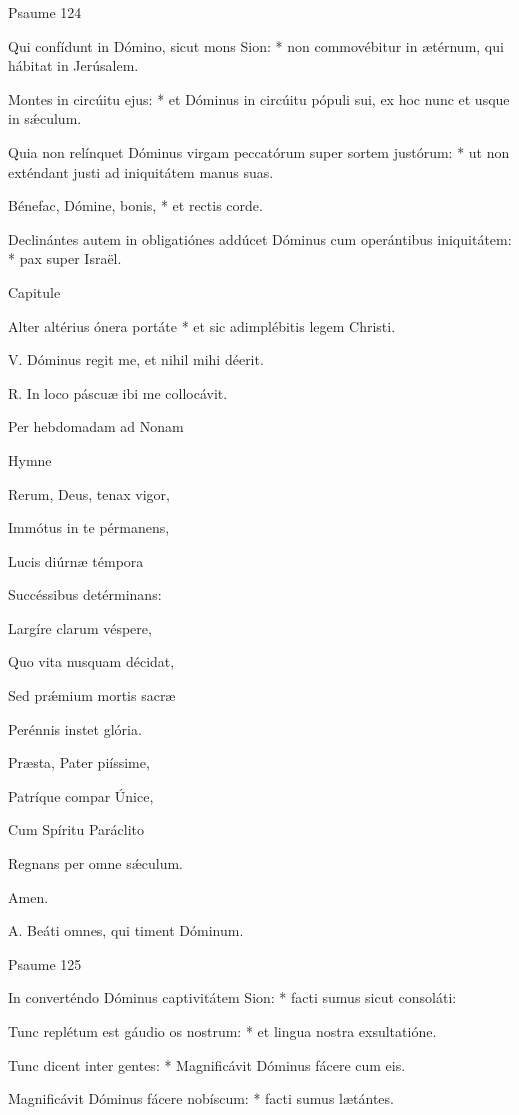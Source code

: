Psaume 124

Qui confídunt in Dómino, sicut mons Sion: * non commovébitur in ætérnum, qui hábitat in Jerúsalem.

Montes in circúitu ejus: * et Dóminus in circúitu pópuli sui, ex hoc nunc et usque in sǽculum.

Quia non relínquet Dóminus virgam peccatórum super sortem justórum: * ut non exténdant justi ad iniquitátem manus suas.

Bénefac, Dómine, bonis, * et rectis corde.

Declinántes autem in obligatiónes addúcet Dóminus cum operántibus iniquitátem: * pax super Israël.


Capitule

Alter altérius ónera portáte * et sic adimplébitis legem Christi.


V. Dóminus regit me, et nihil mihi déerit.

R. In loco páscuæ ibi me collocávit.





Per hebdomadam ad Nonam


Hymne

Rerum, Deus, tenax vigor,

Immótus in te pérmanens,

Lucis diúrnæ témpora

Succéssibus detérminans:


Largíre clarum véspere,

Quo vita nusquam décidat,

Sed prǽmium mortis sacræ

Perénnis instet glória.


Præsta, Pater piíssime,

Patríque compar Únice,

Cum Spíritu Paráclito

Regnans per omne sǽculum.

Amen.


A. Beáti omnes, qui timent Dóminum.


Psaume 125

In converténdo Dóminus captivitátem Sion: * facti sumus sicut consoláti:

Tunc replétum est gáudio os nostrum: * et lingua nostra exsultatióne.

Tunc dicent inter gentes: * Magnificávit Dóminus fácere cum eis.

Magnificávit Dóminus fácere nobíscum: * facti sumus lætántes.

